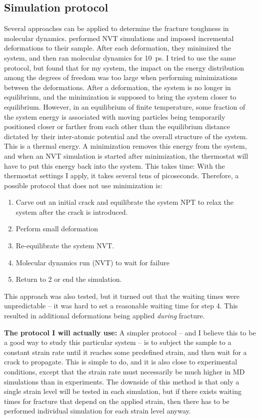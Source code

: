\subsection{Simulation protocol}
Several approaches can be applied to determine the fracture toughness in molecular dynamics. \citet{Hantal2014}performed NVT simulations and imposed incremental deformations to their sample. After each deformation, they minimized the system, and then ran molecular dynamics for \SI{10}{\pico\second}. I tried to use the same protocol, but found that for my system, the impact on the energy distribution among the degrees of freedom was too large when performing minimizations between the deformations. After a deformation, the system is no longer in equilibrium, and the minimization is supposed to bring the system closer to equilibrium. However, in an equilibrium of finite temperature, some fraction of the system energy is associated with moving particles being temporarily positioned closer or farther from each other than the equilibrium distance dictated by their inter-atomic potential and the overall structure of the system. This is a thermal energy. A minimization removes this energy from the system, and when an NVT simulation is started after minimization, the thermostat will have to put this energy back into the system. This takes time: With the thermostat settings I apply, it takes several tens of picoseconds. Therefore, a possible protocol that does not use minimization is:
\begin{enumerate}
\item Carve out an initial crack and equilibrate the system NPT to relax the system after the crack is introduced.
\item Perform small deformation
\item Re-equilibrate the system NVT.
\item Molecular dynamics run (NVT) to wait for failure
\item Return to 2 or end the simulation. 
\end{enumerate}
This approach was also tested, but it turned out that the waiting times were unpredictable -- it was hard to set a reasonable waiting time for step 4. This resulted in additional deformations being applied \emph{during} fracture. 
%
\begin{framed}
\textbf{The protocol I will actually use:} A simpler protocol -- and I believe this to be a good way to study this particular system -- is to subject the sample to a constant strain rate until it reaches some predefined strain, and then wait for a crack to propagate. This is simple to do, and it is also close to experimental conditions, except that the strain rate must necessarily be much higher in MD simulations than in experiments. The downside of this method is that only a single strain level will be tested in each simulation, but if there exists waiting times for fracture that depend on the applied strain, then there has to be performed individual simulation for each strain level anyway.
\end{framed}

